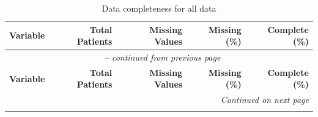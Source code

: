 \begin{longtable}{lrrrr}
\caption{Data completeness for all data} \label{tab:data_summary} \\

\toprule
\textbf{Variable} & \textbf{Total Patients} & \textbf{Missing Values} & \textbf{Missing (\%)} & \textbf{Complete (\%)} \\
\midrule
\endfirsthead

\multicolumn{5}{c}{\tablename\ \thetable{} -- \textit{continued from previous page}} \\
\toprule
\textbf{Variable} & \textbf{Total Patients} & \textbf{Missing Values} & \textbf{Missing (\%)} & \textbf{Complete (\%)} \\
\midrule
\endhead

\midrule
\multicolumn{5}{r}{\textit{Continued on next page}} \\
\endfoot

\bottomrule
\endlastfoot


\end{longtable}
